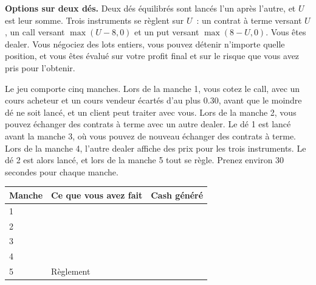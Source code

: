 \begin{question}\label{iq:iv2:played-games:2}
\textbf{Options sur deux dés.} Deux dés équilibrés sont lancés l'un après l'autre, et $U$ est leur somme. Trois instruments se règlent sur $U$~: un contrat à terme versant $U$, un call versant $\max(U - 8, 0)$ et un put versant $\max(8 - U, 0)$. Vous êtes dealer. Vous négociez des lots entiers, vous pouvez détenir n'importe quelle position, et vous êtes évalué sur votre profit final et sur le risque que vous avez pris pour l'obtenir.

Le jeu comporte cinq manches. Lors de la manche 1, vous cotez le call, avec un cours acheteur et un cours vendeur écartés d'au plus 0.30, avant que le moindre dé ne soit lancé, et un client peut traiter avec vous. Lors de la manche 2, vous pouvez échanger des contrats à terme avec un autre dealer. Le dé 1 est lancé avant la manche 3, où vous pouvez de nouveau échanger des contrats à terme. Lors de la manche 4, l'autre dealer affiche des prix pour les trois instruments. Le dé 2 est alors lancé, et lors de la manche 5 tout se règle. Prenez environ 30 secondes pour chaque manche.

\medskip
\begin{tabular}{@{}l|p{7.5cm}|l@{}}
Manche & Ce que vous avez fait & Cash généré \\ \hline
1 & & \\[8pt]\hline
2 & & \\[8pt]\hline
3 & & \\[8pt]\hline
4 & & \\[8pt]\hline
5 & Règlement & \\[8pt]\hline
\end{tabular}
\end{question}
\vfill\clearpage

